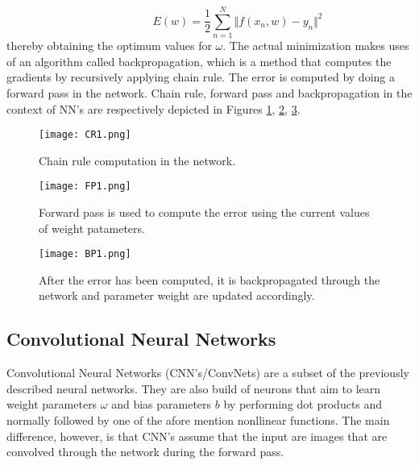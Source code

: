 \begin{itemize}
\begin{equation} \label{eq:LS1}
\hspace{3em} \hspace{3em} \hspace{3em} E (w) = \frac{1}{2} \sum\limits_{n=1}^N \Vert f(x_n,w) - y_n\Vert^2 \enspace \enspace \hspace{3em}
\end{equation} 
thereby obtaining the optimum values for $\omega$. The actual minimization makes uses of an algorithm called backpropagation, which is a method that computes the gradients by recursively applying chain rule. The error is computed by doing a forward pass in the network. Chain rule, forward pass and backpropagation in the context of NN's are respectively depicted in Figures \ref{fig:CRim1}, \ref{fig:FPim1}, \ref{fig:BPim1}.   

\end{itemize} 
\begin{figure}[tb] 
\centering 
\texttt{[image: CR1.png]} 
\caption[Chain rule in neural networks]{Chain rule computation in the network.}
\label{fig:CRim1} 
\end{figure}
\begin{figure}[tb] 
\centering 
\texttt{[image: FP1.png]} 
\caption[Forward pass to compute error]{Forward pass is used to compute the error using the current values of weight patameters.}
\label{fig:FPim1} 
\end{figure}
\begin{figure}[tb] 
\centering 
\texttt{[image: BP1.png]} 
\caption[Backpropagation process through the network]{After the error has been computed, it is backpropagated through the network and parameter weight are updated accordingly.}
\label{fig:BPim1} 
\end{figure} 	

\subsection{Convolutional Neural Networks}
Convolutional Neural Networks (CNN's/ConvNets) are a subset of the previously described neural networks. They are also build of neurons that aim to learn weight parameters $\omega$ and bias parameters $b$ by performing dot products and normally followed by one of the afore mention nonllinear functions. The main difference, however, is that CNN's assume that the input are images that are convolved through the network during the forward pass.  

